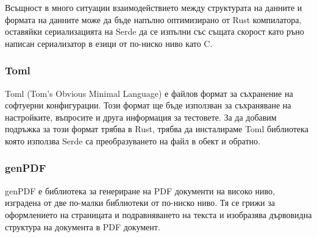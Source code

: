 Всъщност в много ситуации взаимодействието между структурата на данните и
формата на данните може да бъде напълно оптимизирано от Rust компилатора,
оставяйки сериализацията на Serde да се изпълни със същата скорост като
ръно написан сериализатор в езици от по-ниско ниво като C.

\subsubsection{Toml}
Toml (Tom's Obvious Minimal Language) е файлов формат за съхранение на
софтуерни конфигурации. Този формат ще бъде използван за съхраняване на
настройките, въпросите и друга информация за тестовете. За да добавим подръжка за
този формат трябва в Rust, трябва да инсталираме Toml библиотека която използва
Serde са преобразуването на файл в обект и обратно.


\subsubsection{genPDF}
genPDF е библиотека за генериране на PDF документи на високо ниво, изградена от
две по-малки библиотеки от по-ниско ниво. Тя се грижи за оформлението на
страницата и подравняването на текста и изобразява дървовидна структура на
документа в PDF документ.
